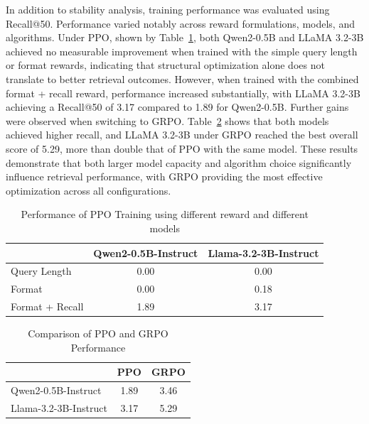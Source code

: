 In addition to stability analysis, training performance was evaluated using Recall@50. Performance varied notably across reward formulations, models, and algorithms. Under PPO, shown by Table~\ref{tab:tab1}, both Qwen2-0.5B and LLaMA 3.2-3B achieved no measurable improvement when trained with the simple query length or format rewards, indicating that structural optimization alone does not translate to better retrieval outcomes. However, when trained with the combined format + recall reward, performance increased substantially, with LLaMA 3.2-3B achieving a Recall@50 of 3.17 compared to 1.89 for Qwen2-0.5B. Further gains were observed when switching to GRPO. Table~\ref{tab:tab2} shows that both models achieved higher recall, and LLaMA 3.2-3B under GRPO reached the best overall score of 5.29, more than double that of PPO with the same model. These results demonstrate that both larger model capacity and algorithm choice significantly influence retrieval performance, with GRPO providing the most effective optimization across all configurations.

\begin{table}[ht]
    \centering
    \caption{Performance of PPO Training using different reward and different models}
    \label{tab:tab1}
    \begin{tabular}{|l|c|c|}
        \hline
        & Qwen2-0.5B-Instruct & Llama-3.2-3B-Instruct \\
        \hline
        Query Length & 0.00 & 0.00 \\
        \hline
        Format & 0.00 & 0.18 \\
        \hline
        Format + Recall & 1.89 & 3.17 \\
        \hline
    \end{tabular}
\end{table}

\begin{table}[ht]
    \centering
    \caption{Comparison of PPO and GRPO Performance}
    \label{tab:tab2}
    \begin{tabular}{|l|c|c|}
        \hline
        & PPO & GRPO \\
        \hline
        Qwen2-0.5B-Instruct & 1.89 & 3.46 \\
        \hline
        Llama-3.2-3B-Instruct & 3.17 & 5.29 \\
        \hline
    \end{tabular}
\end{table}